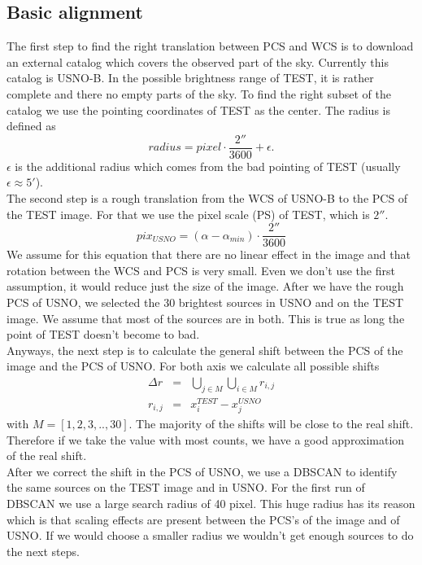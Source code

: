 \subsection{Basic alignment}
The first step to find the right translation between PCS and WCS is to download an external catalog which covers the observed part of the sky. Currently this catalog is USNO-B. In the possible brightness range of TEST, it is rather complete and there no empty parts of the sky. To find the right subset of the catalog we use the pointing coordinates of TEST as the center. The radius is defined as 
\begin{equation}
	radius=pixel \cdot \frac{2''}{3600}+\epsilon.
\end{equation}
$\epsilon$ is the additional radius which comes from the bad pointing of TEST (usually $\epsilon\approx 5'$).\\
The second step is a rough translation from the WCS of USNO-B to the PCS of the TEST image. For that we use the pixel scale (PS) of TEST, which is $2''$.
\begin{equation}
	pix_{USNO} = (\alpha - \alpha_{min}) \cdot \frac{2''}{3600}
\end{equation}
We assume for this equation that there are no linear effect in the image and that rotation between the WCS and PCS is very small. Even we don't use the first assumption, it would reduce just the size of the image. After we have the rough PCS of USNO, we selected the 30 brightest sources in USNO and on the TEST image. We assume that most of the sources are in both. This is true as long the point of TEST doesn't become to bad. \\
Anyways, the next step is to calculate the general shift between the PCS of the image and the PCS of USNO. For both axis we calculate all possible shifts
\begin{eqnarray}
	\Delta r &=& \bigcup\limits_{j \in M}\bigcup\limits_{i \in M} r_{i, j}\\
	r_{i, j} &=& x_i^{TEST}-x_j^{USNO}
\end{eqnarray}
with $M=[1, 2, 3, .., 30]$.
The majority of the shifts will be close to the real shift. Therefore if we take the value with most counts, we have a good approximation of the real shift. \\
After we correct the shift in the PCS of USNO, we use a DBSCAN to identify the same sources on the TEST image and in USNO. For the first run of DBSCAN we use a large search radius of 40 pixel. This huge radius has its reason which is that scaling effects are present between the PCS's of the image and of USNO. If we would choose a smaller radius we wouldn't get enough sources to do the next steps.\\
